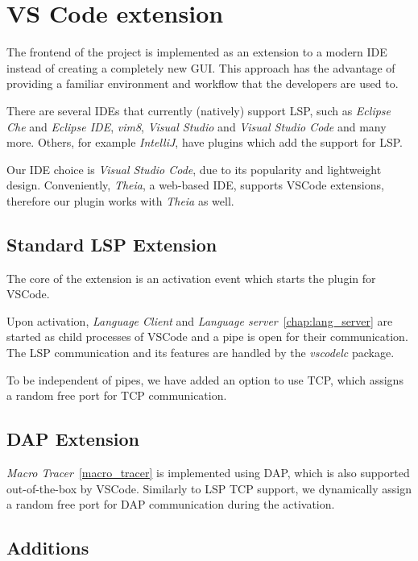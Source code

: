 \chapter{VS Code extension}

The frontend of the project is implemented as an extension to a modern IDE instead of creating a completely new GUI. This approach has the advantage of providing a familiar environment and workflow that the developers are used to.

There are several IDEs that currently (natively) support LSP, such as \emph{Eclipse Che} and \emph{Eclipse IDE}, \emph{vim8}, \emph{Visual Studio} and \emph{Visual Studio Code} and many more. Others, for example \emph{IntelliJ}, have plugins which add the support for LSP.

Our IDE choice is \emph{Visual Studio Code}, due to its popularity and lightweight design. Conveniently, \emph{Theia}, a web-based IDE, supports VSCode extensions, therefore our plugin works with \emph{Theia} as well.

\section{Standard LSP Extension}

The core of the extension is an activation event which starts the plugin for VSCode.

Upon activation, \emph{Language Client} and \emph{Language server}~\ref{chap:lang_server} are started as child processes of VSCode and a pipe is open for their communication. The LSP communication and its features are handled by the \emph{vscodelc} package. 

To be independent of pipes, we have added an option to use TCP, which assigns a random free port for TCP communication.

\section{DAP Extension}

\emph{Macro Tracer}~\ref{macro_tracer} is implemented using DAP, which is also supported out-of-the-box by VSCode. Similarly to LSP TCP support, we dynamically assign a random free port for DAP communication during the activation.

\section{Additions}

